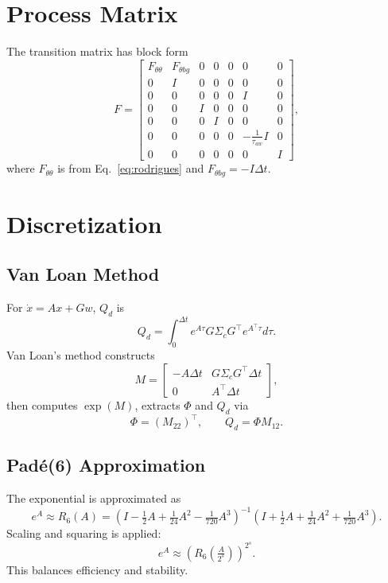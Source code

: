 \documentclass[11pt]{article}
\begin{document}
\section{Process Matrix}
The transition matrix has block form
\begin{equation}
F = \begin{bmatrix}
F_{\theta\theta} & F_{\theta bg} & 0 & 0 & 0 & 0 & 0 \\
0 & I & 0 & 0 & 0 & 0 & 0 \\
0 & 0 & 0 & 0 & 0 & I & 0 \\
0 & 0 & I & 0 & 0 & 0 & 0 \\
0 & 0 & 0 & I & 0 & 0 & 0 \\
0 & 0 & 0 & 0 & 0 & -\tfrac{1}{\tau_{aw}}I & 0 \\
0 & 0 & 0 & 0 & 0 & 0 & I
\end{bmatrix},
\end{equation}
where $F_{\theta\theta}$ is from Eq.~\eqref{eq:rodrigues} and $F_{\theta bg}=-I\Delta t$.

\section{Discretization}
\subsection{Van Loan Method}
For $\dot x = A x + G w$, $Q_d$ is
\begin{equation}
Q_d = \int_0^{\Delta t} e^{A\tau} G \Sigma_c G^\top e^{A^\top\tau} d\tau.
\end{equation}
Van Loan’s method constructs
\begin{equation}
M = \begin{bmatrix}
- A \Delta t & G \Sigma_c G^\top \Delta t \\
0 & A^\top \Delta t
\end{bmatrix},
\end{equation}
then computes $\exp(M)$, extracts $\Phi$ and $Q_d$ via
\begin{equation}
\Phi = (M_{22})^\top, \qquad Q_d = \Phi M_{12}.
\end{equation}

\subsection{Padé(6) Approximation}
The exponential is approximated as
\begin{equation}
e^A \approx R_6(A) = \left(I - \tfrac{1}{2}A + \tfrac{1}{24}A^2 - \tfrac{1}{720}A^3\right)^{-1}
\left(I + \tfrac{1}{2}A + \tfrac{1}{24}A^2 + \tfrac{1}{720}A^3\right).
\end{equation}
Scaling and squaring is applied:
\begin{equation}
e^A \approx \left( R_6\!\left(\tfrac{A}{2^s}\right) \right)^{2^s}.
\end{equation}
This balances efficiency and stability.
\end{document}
